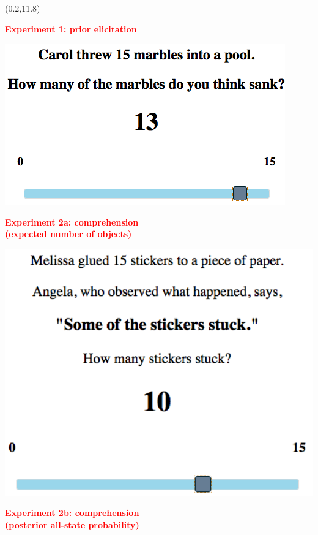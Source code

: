 \documentclass[a0,portrait]{a0poster}
\newcommand{\red}[1]{\textcolor{Red}{#1}}
\begin{document}
\begin{textblock}{7}
\begin{textblock}{3.2}(0.2,11.8)
\large

\textbf{\red{Experiment 1: prior elicitation}}

\includegraphics[width=\textwidth]{pics/display-priors.png}

\vspace{.6em}

\textbf{\red{Experiment 2a: comprehension\\(expected number of objects)}}

\includegraphics[width=1.05\textwidth]{pics/display-priordv.png}

\vspace{.6em}

\textbf{\red{Experiment 2b: comprehension\\(posterior all-state probability)}}


\end{textblock}
\end{textblock}
\end{document}
